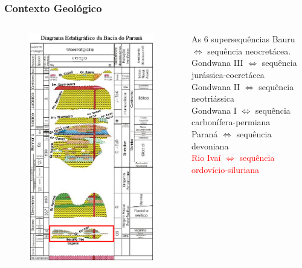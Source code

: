 \documentclass[aspectratio=10]{beamer} %
\begin{document}
\begin{frame}
\frametitle{Contexto Geológico}
\begin{columns}
\begin{column}{0.4\textwidth}
\begin{figure}
\includegraphics[scale=0.36]{Imagens/diagramarioivai.png}
\end{figure}
\end{column}
\begin{column}{0.55\textwidth}
\begin{block}{As $6$ supersequências}
Bauru $\Longleftrightarrow$  sequência neocretácea.\\
Gondwana III $\Longleftrightarrow$ sequência jurássica-eocretácea\\
Gondwana II $\Longleftrightarrow$ sequência neotriássica \\
Gondwana I $\Longleftrightarrow$ sequência carbonífera-permiana\\ 
Paraná $\Longleftrightarrow$ sequência devoniana\\
\textcolor{red}{Rio Ivaí $\Longleftrightarrow$ sequência ordovício-siluriana}\\
\cite{Vail_1977,assine_1994,milani_orogenias_1998}
\end{block}
\end{column}
\end{columns}
\end{frame}
\end{document}
